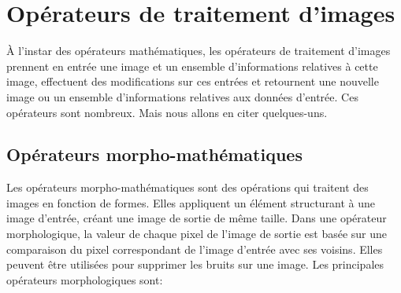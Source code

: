 \section{Opérateurs de traitement d'images}
À l’instar des opérateurs mathématiques, les opérateurs de traitement d’images prennent en entrée une image et un ensemble d’informations relatives à cette image, effectuent des modifications sur ces entrées et retournent une nouvelle image ou un ensemble d’informations relatives aux données d’entrée. Ces opérateurs sont nombreux. Mais nous allons en citer quelques-uns.
    \subsection{Opérateurs morpho-mathématiques}
Les opérateurs morpho-mathématiques sont des opérations qui traitent des images en fonction de formes. Elles appliquent un élément structurant à une image d'entrée, créant une image de sortie de même taille. Dans une opérateur morphologique, la valeur de chaque pixel de l'image de sortie est basée sur une comparaison du pixel correspondant de l'image d'entrée avec ses voisins. Elles peuvent être utilisées pour supprimer les bruits sur une image. Les principales opérateurs morphologiques sont:
